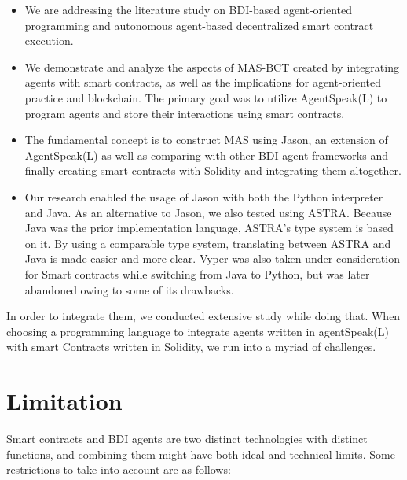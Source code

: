 \begin{itemize}
    \item We are addressing the literature study on \ac{BDI}-based agent-oriented programming and autonomous agent-based decentralized smart contract execution.

    \item We demonstrate and analyze the aspects of \ac{MAS}-\ac{BCT} created by integrating agents with smart contracts, as well as the implications for agent-oriented practice and blockchain. The primary goal was to utilize AgentSpeak(L) to program agents and store their interactions using smart contracts.
    
\vspace{.5cm}

    \item  The fundamental concept is to construct \ac{MAS} using Jason, an extension of AgentSpeak(L) as well as comparing with other \ac{BDI} agent frameworks and finally creating smart contracts with Solidity and integrating them altogether.
    
\vspace{.5cm}

    \item Our research enabled the usage of Jason with both the Python interpreter and Java. As an alternative to Jason, we also tested using ASTRA. Because Java was the prior implementation language, ASTRA's type system is based on it. By using a comparable type system, translating between ASTRA and Java is made easier and more clear. Vyper was also taken under consideration for Smart contracts while switching from Java to Python, but was later abandoned owing to some of its drawbacks.
    
\vspace{.5cm}

\end{itemize}

In order to integrate them, we conducted extensive study while doing that. When choosing a programming language to integrate agents written in agentSpeak(L) with smart Contracts written in Solidity, we run into a myriad of challenges.

\section{Limitation}

Smart contracts and \ac{BDI} agents are two distinct technologies with distinct functions, and combining them might have both ideal and technical limits. Some restrictions to take into account are as follows:

